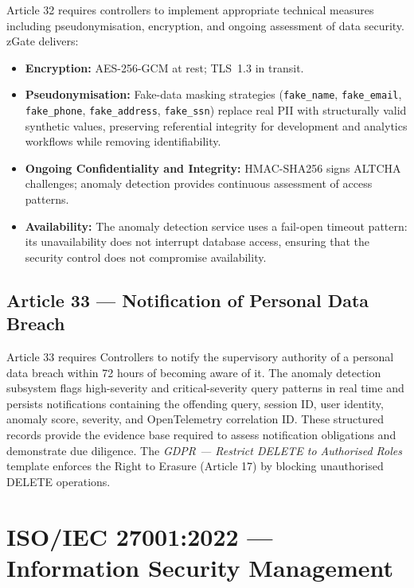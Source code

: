 Article 32 requires controllers to implement appropriate technical measures including pseudonymisation, encryption, and ongoing assessment of data security. zGate delivers:
\begin{itemize}
    \item \textbf{Encryption:} AES-256-GCM at rest; TLS~1.3 in transit.
    \item \textbf{Pseudonymisation:} Fake-data masking strategies (\texttt{fake\_name}, \texttt{fake\_email}, \texttt{fake\_phone}, \texttt{fake\_address}, \texttt{fake\_ssn}) replace real PII with structurally valid synthetic values, preserving referential integrity for development and analytics workflows while removing identifiability.
    \item \textbf{Ongoing Confidentiality and Integrity:} HMAC-SHA256 signs ALTCHA challenges; anomaly detection provides continuous assessment of access patterns.
    \item \textbf{Availability:} The anomaly detection service uses a fail-open timeout pattern: its unavailability does not interrupt database access, ensuring that the security control does not compromise availability.
\end{itemize}

\subsection{Article 33 --- Notification of Personal Data Breach}

Article 33 requires Controllers to notify the supervisory authority of a personal data breach within 72 hours of becoming aware of it. The anomaly detection subsystem flags high-severity and critical-severity query patterns in real time and persists notifications containing the offending query, session ID, user identity, anomaly score, severity, and OpenTelemetry correlation ID. These structured records provide the evidence base required to assess notification obligations and demonstrate due diligence. The \textit{GDPR --- Restrict DELETE to Authorised Roles} template enforces the Right to Erasure (Article 17) by blocking unauthorised DELETE operations.

\section{ISO/IEC 27001:2022 --- Information Security Management}

